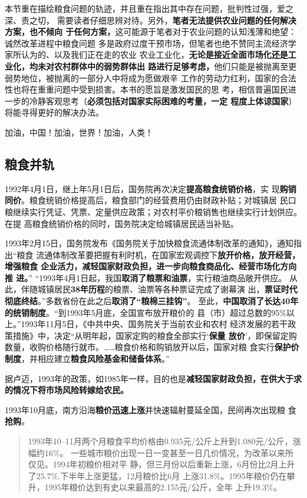 本节重在描绘粮食问题的轨迹，并且重在指出其中存在问题，批判性过强，爱之深、责之切，
需要读者仔细思辨对待。另外，\textbf{笔者无法提供农业问题的任何解决方案，也不倾向
  于任何方案，}这可能源于笔者对于农业问题的认知浅薄和绝望：诚然改革进程中粮食问题
多是政府过度干预市场，但笔者也绝不赞同主流经济学家所认为的、以及我们正在走的农业
农业工业化，\textbf{无论是接近全面市场化还是工业化，均未对农村群体中的弱势群体出
  路进行足够考虑，}他们只能是被抛离至更弱势地位，被抛离的一部分人中将成为愿做艰辛
工作的劳动力红利，国家的合法性也将在重重问题中受到损害。本书的愿旨是激发国民的思
考，相信普遍国民进一步的冷静客观思考（\textbf{必须包括对国家实际困难的考量，一定
  程度上体谅国家}）将能寻得更好的解决办法。

加油，中国！加油，世界！加油，人类！

\subsection{粮食并轨}

1992年4月1日，继上年5月1日后，国务院再次决定\textbf{提高粮食统销价格}，实
现\textbf{购销同价}。粮食统销价格提高后，粮食部门的经营费用仍由财政补贴；对城镇居
民口粮继续实行凭证、凭票、定量供应政策；对农村平价粮销售也继续实行计划供应。在提
高粮食统销价格的同时，国务院决定给城镇居民适当补贴。

1993年2月15日，国务院发布《国务院关于加快粮食流通体制改革的通知》，通知指出“粮食
流通体制改革要把握有利时机，在国家宏观调控下\textbf{放开价格，放开经营，增强粮食
  企业活力，减轻国家财政负担，进一步向粮食商品化、经营市场化方向推
  进。}” “1993年4月1日起，我国\textbf{取消了粮票和油票}，实行粮油商品敞开供应。
从此，伴随城镇居民\textbf{38年历程}的粮票、油票等各种票证完成了谢幕演
出，\textbf{票证时代彻底终结}。”多数省份在此之后\textbf{取消了“粮棉三挂钩”}。
至此，\textbf{中国取消了长达40年的统销制度}。“到1993年5月底，全国宣布放开粮价的
县（市）超过总数的95\%以上。”1993年11月5日，《中共中央、国务院关于当前农业和农村
经济发展的若干政策措施》中，决定“从明年起，国家定购的粮食全部实行‘\textbf{保量
  放价}’，即保留定购数量，收购价格随行就市。……粮食价格和购销放开以后，国家对粮
食实行\textbf{保护价制度}，并相应建立\textbf{粮食风险基金和储备体系}。”

据卢迈，1993年的政策，如1985年一样，目的也是\textbf{减轻国家财政负担，在供大于求
  的情况下将市场风险转嫁给农民。}\cite{lumaisg}

1993年10月底，南方沿海\textbf{粮价迅速上涨}并快速辐射蔓延全国，民间再次出现粮
食\textbf{抢购}。
\begin{quotation}
  1993年10--11月两个月粮食平均价格由0.935元/公斤上升到1.080元/公斤，涨幅约16\%。
  一些城市粮价出现一日一变甚至一日几价情况，为改革以来所仅见。1994年初粮价相对平
  静，但三月份以后重新上涨，6月份比2月上升了25.7\%.下半年上涨更猛，12月粮价比6月
  上涨31.8\%。1995年粮价仍在攀升，1995年粮价达到有史以来最高的2.155元/公斤，全年
  上升19.3\%。\cite{lufengsanci}
\end{quotation}

